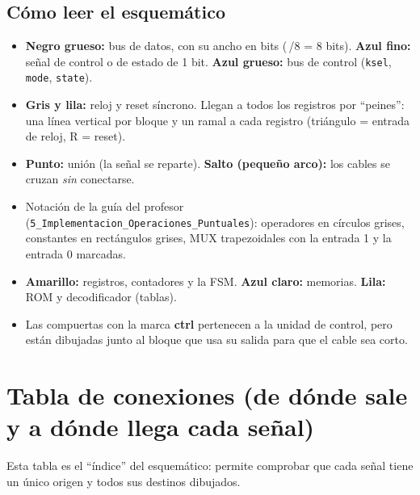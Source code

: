 \documentclass[11pt,a4paper]{article}
\newcommand{\sig}[1]{\texttt{\color{azul}#1}}
\begin{document}
\subsection{Cómo leer el esquemático}
\begin{itemize}
\item \textbf{Negro grueso:} bus de datos, con su ancho en bits (\,/8 = 8 bits). \textbf{Azul fino:} señal de control o de estado de 1 bit. \textbf{Azul grueso:} bus de control (\sig{ksel}, \sig{mode}, \sig{state}).
\item \textbf{Gris y lila:} reloj y reset síncrono. Llegan a todos los registros por ``peines'': una línea vertical por bloque y un ramal a cada registro (triángulo = entrada de reloj, R = reset).
\item \textbf{Punto:} unión (la señal se reparte). \textbf{Salto (pequeño arco):} los cables se cruzan \emph{sin} conectarse.
\item Notación de la guía del profesor (\texttt{5\_Implementacion\_Operaciones\_Puntuales}): operadores en círculos grises, constantes en rectángulos grises, MUX trapezoidales con la entrada 1 y la entrada 0 marcadas.
\item \textbf{Amarillo:} registros, contadores y la FSM. \textbf{Azul claro:} memorias. \textbf{Lila:} ROM y decodificador (tablas).
\item Las compuertas con la marca \textbf{ctrl} pertenecen a la unidad de control, pero están dibujadas junto al bloque que usa su salida para que el cable sea corto.
\end{itemize}

\section{Tabla de conexiones (de dónde sale y a dónde llega cada señal)}
Esta tabla es el ``índice'' del esquemático: permite comprobar que cada señal tiene un único origen y todos sus destinos dibujados.
\end{document}
